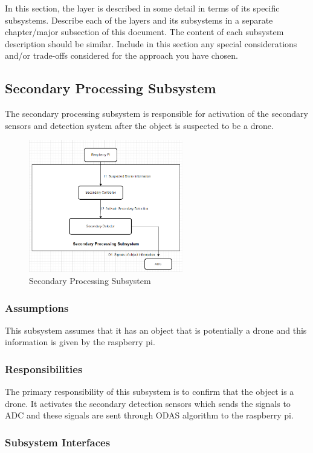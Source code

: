 In this section, the layer is described in some detail in terms of its specific subsystems. Describe each of the layers and its subsystems in a separate chapter/major subsection of this document. The content of each subsystem description should be similar. Include in this section any special considerations and/or trade-offs considered for the approach you have chosen.

\subsection{Secondary Processing Subsystem}
The secondary processing subsystem is responsible for activation of the secondary sensors and detection system after the object is suspected to be a drone.

\begin{figure}[h!]
	\centering
 	\includegraphics[width=0.60\textwidth]{images/Secondary Processing_Subsystem.png}
 \caption{Secondary Processing Subsystem}
\end{figure}

\subsubsection{Assumptions}
This subsystem assumes that it has an object that is potentially a drone and this information is given by the raspberry pi. 

\subsubsection{Responsibilities}
The primary responsibility of this subsystem is to confirm that the object is a drone. It activates the secondary detection sensors which sends the signals to ADC and these signals are sent through ODAS algorithm to the raspberry pi.

\subsubsection{Subsystem Interfaces}

